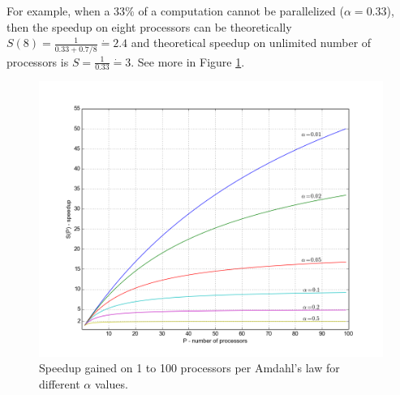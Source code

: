 For example, when a 33\% of a computation cannot be parallelized ($\alpha = 0.33$), then the speedup on eight processors can be theoretically $S(8) = \frac{1}{0.33+0.7/8} \dot= 2.4$ and theoretical speedup on unlimited number of processors is $S = \frac{1}{0.33} \dot= 3$. See more in Figure \ref{fig:amdahl}.
\begin{figure}[ht]
    \centering
    \includegraphics[width=1\textwidth]{chapter2/Amdahl.png}
    \caption{Speedup gained on 1 to 100 processors per Amdahl's law for different $\alpha$ values.}
    \label{fig:amdahl}
\end{figure}

